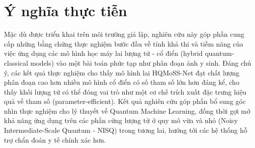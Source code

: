 \section{Ý nghĩa thực tiễn}
Mặc dù được triển khai trên môi trường giả lập, nghiên cứu này góp phần cung cấp những bằng chứng thực nghiệm bước đầu về tính khả thi và tiềm năng của việc ứng dụng các mô hình học máy lai lượng tử - cổ điển (hybrid quantum-classical models) vào một bài toán phức tạp như phân đoạn ảnh y sinh. Đáng chú ý, các kết quả thực nghiệm cho thấy mô hình lai HQMoSS-Net đạt chất lượng phân đoạn cao hơn nhiều mô hình cổ điển có số tham số lớn hơn đáng kể, cho thấy khối lượng tử có thể đóng vai trò như một cơ chế trích xuất đặc trưng hiệu quả về tham số (parameter-efficient). Kết quả nghiên cứu góp phần bổ sung góc nhìn thực nghiệm cho lý thuyết về Quantum Machine Learning, đồng thời gợi mở khả năng ứng dụng trên các phần cứng lượng tử ở quy mô vừa và nhỏ (Noisy Intermediate-Scale Quantum - NISQ) trong tương lai, hướng tới các hệ thống hỗ trợ chẩn đoán y tế chính xác hơn.

